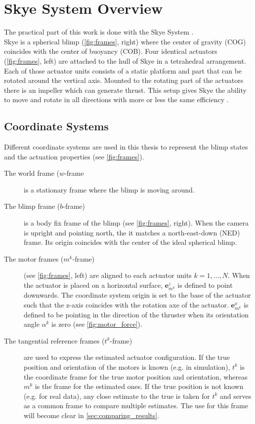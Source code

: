 \section{Skye System Overview}
The practical part of this work is done with the Skye System \citep{Skye2013}.\\
Skye is a spherical blimp (\cref{fig:frames}, right) where the center of gravity (COG) coincides with the center of buoyancy (COB).
Four identical actuators (\cref{fig:frames}, left) are attached to the hull of Skye in a tetrahedral arrangement.
Each of those actuator units consists of a static platform and part that can be rotated around the vertical axis.
Mounted to the rotating part of the actuators there is an impeller which can generate thrust.
This setup gives Skye the ability to move and rotate in all directions with more or less the same efficiency \citep[see][chap. 3]{Schaffner2012}.

\subsection{Coordinate Systems}
\label{sub:coordinate_systems}
Different coordinate systems are used in this thesis to represent the blimp states and the actuation properties (see \cref{fig:frames}).
\begin{description}
\item[The world frame ($w$-frame] is a stationary frame where the blimp is moving around.
\item[The blimp frame ($b$-frame)] is a body fix frame of the blimp (see \cref{fig:frames}, right).
When the camera is upright and pointing north, the it matches a north-east-down (NED) frame.
Its origin coincides with the center of the ideal spherical blimp.
\item[The motor frames ($m^k$-frame)] (see \cref{fig:frames}, left) are aligned to each actuator units $k=1,...,N$.
When the actuator is placed on a horizontal surface, $\mathbf{e}_{m^k}^z$ is defined to point downwards.
The coordinate system origin is set to the base of the actuator such that the z-axis coincides with the rotation axe of the actuator.
$\mathbf{e}_{m^k}^x$ is defined to be pointing in the direction of the thruster when its orientation angle $\alpha^k$ is zero (see \cref{fig:motor_force}).
\item[The tangential reference frames ($t^k$-frame)] are used to express the estimated actuator configuration.
If the true position and orientation of the motors is known (e.g. in simulation), $t^k$ is the coordinate frame for the true motor position and orientation, whereas $m^k$ is the frame for the estimated ones.
If the true position is not known (e.g. for real data), any close estimate to the true is taken for $t^k$ and serves as a common frame to compare multiple estimates.
The use for this frame will become clear in \cref{sec:comparing_results}.
\end{description}


